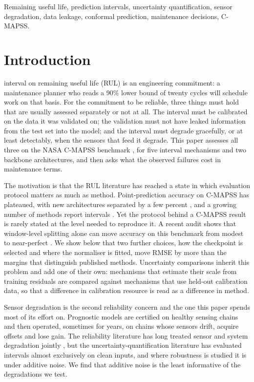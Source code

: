 \documentclass[journal]{IEEEtran}
\begin{document}
\begin{IEEEkeywords}
Remaining useful life, prediction intervals, uncertainty quantification, sensor degradation, data leakage, conformal prediction, maintenance decisions, C-MAPSS.
\end{IEEEkeywords}

\section{Introduction}
 interval on remaining useful life (RUL) is an engineering commitment: a maintenance planner who reads a 90\% lower bound of twenty cycles will schedule work on that basis. For the commitment to be reliable, three things must hold that are usually assessed separately or not at all. The interval must be calibrated on the data it was validated on; the validation must not have leaked information from the test set into the model; and the interval must degrade gracefully, or at least detectably, when the sensors that feed it degrade. This paper assesses all three on the NASA C-MAPSS benchmark \cite{saxena2008}, for five interval mechanisms and two backbone architectures, and then asks what the observed failures cost in maintenance terms.

The motivation is that the RUL literature has reached a state in which evaluation protocol matters as much as method. Point-prediction accuracy on C-MAPSS has plateaued, with new architectures separated by a few percent \cite{tang2025,chen2024,deng2024,ruvaifa2026}, and a growing number of methods report intervals \cite{basora2025,zhan2024,peng2019,ayed2025,piao2025,mao2024}. Yet the protocol behind a C-MAPSS result is rarely stated at the level needed to reproduce it. A recent audit shows that window-level splitting alone can move accuracy on this benchmark from modest to near-perfect \cite{shamim2026}. We show below that two further choices, how the checkpoint is selected and where the normaliser is fitted, move RMSE by more than the margins that distinguish published methods. Uncertainty comparisons inherit this problem and add one of their own: mechanisms that estimate their scale from training residuals are compared against mechanisms that use held-out calibration data, so that a difference in calibration resource is read as a difference in method.

Sensor degradation is the second reliability concern and the one this paper spends most of its effort on. Prognostic models are certified on healthy sensing chains and then operated, sometimes for years, on chains whose sensors drift, acquire offsets and lose gain. The reliability literature has long treated sensor and system degradation jointly \cite{hachem2024,chen2027}, but the uncertainty-quantification literature has evaluated intervals almost exclusively on clean inputs, and where robustness is studied it is under additive noise. We find that additive noise is the least informative of the degradations we test.
\end{document}
